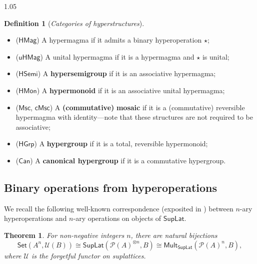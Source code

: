 \documentclass[reqno]{amsart}
\newcommand{\pow}{\mathcal{P}}
\newcommand{\cat}{\mathsf}
\numberwithin{equation}{section}
\theoremstyle{plain}
\newtheorem{theorem}[equation]{Theorem}
\theoremstyle{definition}
\newtheorem{definition}[equation]{Definition}
\begin{document}
\begin{spacing}{1.05}
\begin{definition}[\textit{Categories of hyperstructures}]
\begin{itemize}
    \item ($\cat{HMag}$) A hypermagma if it admits a binary hyperoperation $\star$;
    
    \item ($\cat{uHMag}$) A unital hypermagma if it is a hypermagma and $\star$ is unital;

    \item ($\cat{HSemi}$) A \textbf{hypersemigroup} if it is an associative hypermagma;

    \item ($\cat{HMon}$) A \textbf{hypermonoid} if it is an associative unital hypermagma;

    \item ($\cat{Msc}$, $\cat{cMsc}$) A \textbf{(commutative)} \textbf{mosaic} if it is a (commutative) reversible hypermagma with identity---note that these structures are not required to be associative;

    \item ($\cat{HGrp}$) A \textbf{hypergroup} if it is a total, reversible hypermonoid;

    \item ($\cat{Can}$) A \textbf{canonical hypergroup} if it is a commutative hypergroup.
\end{itemize}
\end{definition}

\subsection{Binary operations from hyperoperations} We recall the following well-known correspondence (exposited in \cite[N]{Dudzik_2016}) between $n$-ary hyperoperations and $n$-ary operations on objects of $\cat{SupLat}$.

\begin{theorem} \label{thm:lattice-ops}
    For non-negative integers $n$, there are natural bijections $$ \cat{Set}(A^n,\mathcal{U}(B)) \cong \cat{SupLat}(\pow(A)^{\otimes n},B) \cong \cat{Mult}_\cat{SupLat}(\pow(A)^n, B),$$ where $\mathcal{U}$ is the forgetful functor on suplattices.
\end{theorem}


\end{spacing}
\end{document}
